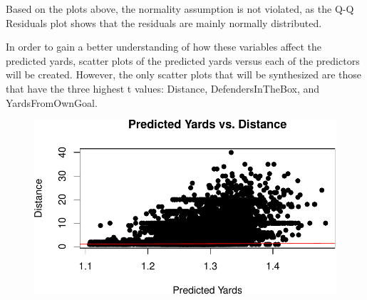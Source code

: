 \documentclass[
  super,
  preprint,
  3p]{elsarticle}
\newenvironment{Shaded}{\begin{snugshade}}{\end{snugshade}}
\newcommand{\AttributeTok}[1]{\textcolor[rgb]{0.40,0.45,0.13}{#1}}
\newcommand{\CommentTok}[1]{\textcolor[rgb]{0.37,0.37,0.37}{#1}}
\newcommand{\DecValTok}[1]{\textcolor[rgb]{0.68,0.00,0.00}{#1}}
\newcommand{\FunctionTok}[1]{\textcolor[rgb]{0.28,0.35,0.67}{#1}}
\newcommand{\NormalTok}[1]{\textcolor[rgb]{0.00,0.23,0.31}{#1}}
\newcommand{\OtherTok}[1]{\textcolor[rgb]{0.00,0.23,0.31}{#1}}
\newcommand{\SpecialCharTok}[1]{\textcolor[rgb]{0.37,0.37,0.37}{#1}}
\newcommand{\StringTok}[1]{\textcolor[rgb]{0.13,0.47,0.30}{#1}}
\begin{document}
Based on the plots above, the normality assumption is not violated, as
the Q-Q Residuals plot shows that the residuals are mainly normally
distributed.

In order to gain a better understanding of how these variables affect
the predicted yards, scatter plots of the predicted yards versus each of
the predictors will be created. However, the only scatter plots that
will be synthesized are those that have the three highest t values:
Distance, DefendersInTheBox, and YardsFromOwnGoal.

\begin{Shaded}
\end{Shaded}

\begin{Shaded}
\end{Shaded}

\begin{figure}[H]

{\centering \includegraphics{project_report_files/figure-pdf/unnamed-chunk-38-1.pdf}

}

\end{figure}
\end{document}
